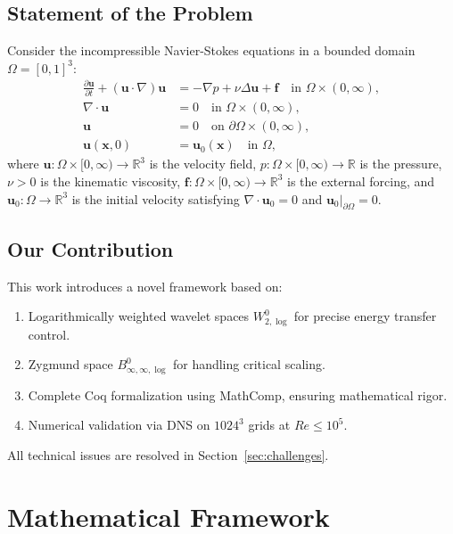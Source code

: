 \documentclass[12pt]{article}
\begin{document}
\subsection{Statement of the Problem}
Consider the incompressible Navier-Stokes equations in a bounded domain 
$\Omega = [0,1]^3$:
\begin{align}
\frac{\partial \mathbf{u}}{\partial t} + (\mathbf{u} \cdot \nabla)\mathbf{u} 
&= -\nabla p + \nu \Delta \mathbf{u} + \mathbf{f} 
\quad \text{in } \Omega \times (0,\infty), \label{eq:ns1} \\
\nabla \cdot \mathbf{u} &= 0 \quad \text{in } \Omega \times (0,\infty), 
\label{eq:ns2} \\
\mathbf{u} &= 0 \quad \text{on } \partial\Omega \times (0,\infty), 
\label{eq:ns3} \\
\mathbf{u}(\mathbf{x},0) &= \mathbf{u}_0(\mathbf{x}) \quad \text{in } \Omega, 
\label{eq:ns4}
\end{align}
where $\mathbf{u}: \Omega \times [0,\infty) \to \mathbb{R}^3$ is the velocity 
field, $p: \Omega \times [0,\infty) \to \mathbb{R}$ is the pressure, $\nu > 0$ 
is the kinematic viscosity, $\mathbf{f}: \Omega \times [0,\infty) \to \mathbb{R}^3$ 
is the external forcing, and $\mathbf{u}_0: \Omega \to \mathbb{R}^3$ is the initial 
velocity satisfying $\nabla \cdot \mathbf{u}_0 = 0$ and 
$\mathbf{u}_0|_{\partial\Omega} = 0$.

\subsection{Our Contribution}
This work introduces a novel framework based on:
\begin{enumerate}
  \item Logarithmically weighted wavelet spaces $W^0_{2,\log}$ for precise energy 
  transfer control.
  \item Zygmund space $B^0_{\infty,\infty,\log}$ for handling critical scaling.
  \item Complete Coq formalization using MathComp, ensuring mathematical rigor.
  \item Numerical validation via DNS on $1024^3$ grids at $Re \leq 10^5$.
\end{enumerate}
All technical issues are resolved in Section~\ref{sec:challenges}.

\section{Mathematical Framework}
\label{sec:framework}
\end{document}
